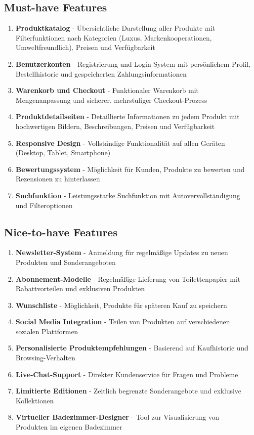 \documentclass[a4paper,11pt]{article}
\begin{document}
\subsection{Must-have Features}
\begin{enumerate}[label=\textbf{MF\arabic*:}]
    \item \textbf{Produktkatalog} - Übersichtliche Darstellung aller Produkte mit Filterfunktionen nach Kategorien (Luxus, Markenkooperationen, Umweltfreundlich), Preisen und Verfügbarkeit
    \item \textbf{Benutzerkonten} - Registrierung und Login-System mit persönlichem Profil, Bestellhistorie und gespeicherten Zahlungsinformationen
    \item \textbf{Warenkorb und Checkout} - Funktionaler Warenkorb mit Mengenanpassung und sicherer, mehrstufiger Checkout-Prozess
    \item \textbf{Produktdetailseiten} - Detaillierte Informationen zu jedem Produkt mit hochwertigen Bildern, Beschreibungen, Preisen und Verfügbarkeit
    \item \textbf{Responsive Design} - Vollständige Funktionalität auf allen Geräten (Desktop, Tablet, Smartphone)
    \item \textbf{Bewertungssystem} - Möglichkeit für Kunden, Produkte zu bewerten und Rezensionen zu hinterlassen
    \item \textbf{Suchfunktion} - Leistungsstarke Suchfunktion mit Autovervollständigung und Filteroptionen
\end{enumerate}

\subsection{Nice-to-have Features}
\begin{enumerate}[label=\textbf{NF\arabic*:}]
    \item \textbf{Newsletter-System} - Anmeldung für regelmäßige Updates zu neuen Produkten und Sonderangeboten
    \item \textbf{Abonnement-Modelle} - Regelmäßige Lieferung von Toilettenpapier mit Rabattvorteilen und exklusiven Produkten
    \item \textbf{Wunschliste} - Möglichkeit, Produkte für späteren Kauf zu speichern
    \item \textbf{Social Media Integration} - Teilen von Produkten auf verschiedenen sozialen Plattformen
    \item \textbf{Personalisierte Produktempfehlungen} - Basierend auf Kaufhistorie und Browsing-Verhalten
    \item \textbf{Live-Chat-Support} - Direkter Kundenservice für Fragen und Probleme
    \item \textbf{Limitierte Editionen} - Zeitlich begrenzte Sonderangebote und exklusive Kollektionen
    \item \textbf{Virtueller Badezimmer-Designer} - Tool zur Visualisierung von Produkten im eigenen Badezimmer
\end{enumerate}
\end{document}
